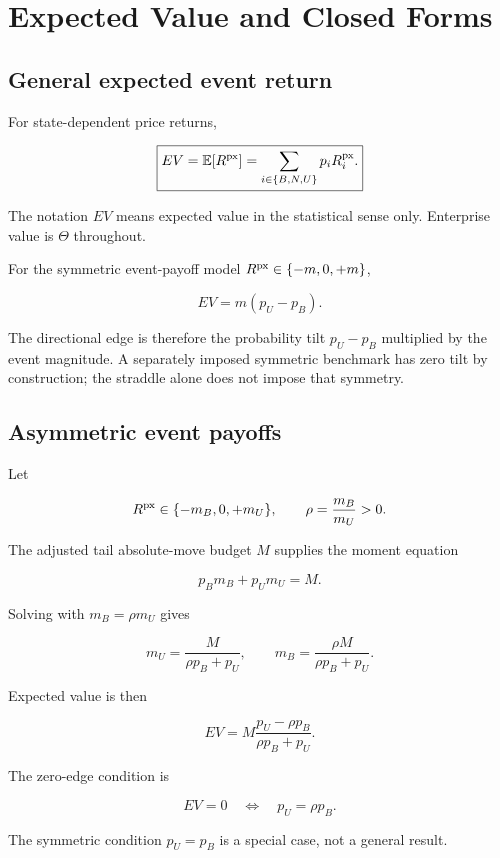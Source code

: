 \section{Expected Value and Closed Forms}
\label{sec:ev}

\subsection{General expected event return}

For state-dependent price returns,

\[
\boxed{
EV=\mathbb{E}[R^{\mathrm{px}}]=\sum_{i\in\{B,N,U\}}p_iR^{\mathrm{px}}_i.
}
\]

The notation $EV$ means expected value in the statistical sense only. Enterprise
value is $\Theta$ throughout.

For the symmetric event-payoff model $R^{\mathrm{px}}\in\{-m,0,+m\}$,

\[
\boxed{
EV=m(p_U-p_B).
}
\]

The directional edge is therefore the probability tilt $p_U-p_B$ multiplied by
the event magnitude. A separately imposed symmetric benchmark has zero tilt by
construction; the straddle alone does not impose that symmetry.

\subsection{Asymmetric event payoffs}
\label{sec:asym}

Let

\[
R^{\mathrm{px}}\in\{-m_B,0,+m_U\},
\qquad
\rho=\frac{m_B}{m_U}>0.
\]

The adjusted tail absolute-move budget $M$ supplies the moment equation

\[
p_Bm_B+p_Um_U=M.
\]

Solving with $m_B=\rho m_U$ gives

\[
\boxed{
m_U=\frac{M}{\rho p_B+p_U},
\qquad
m_B=\frac{\rho M}{\rho p_B+p_U}.
}
\]

Expected value is then

\[
\boxed{
EV=M\frac{p_U-\rho p_B}{\rho p_B+p_U}.
}
\]

The zero-edge condition is

\[
\boxed{
EV=0\quad\Longleftrightarrow\quad p_U=\rho p_B.
}
\]

The symmetric condition $p_U=p_B$ is a special case, not a general result.

